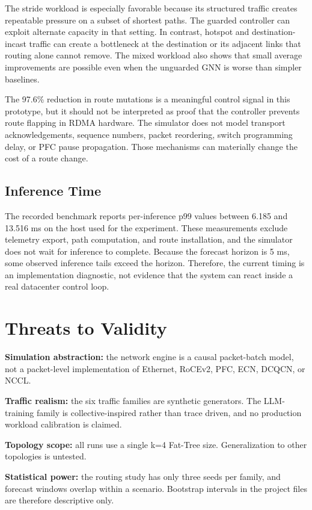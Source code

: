 \documentclass[conference]{IEEEtran}
\begin{document}
The stride workload is especially favorable because its structured traffic creates repeatable pressure on a subset of shortest paths. The guarded controller can exploit alternate capacity in that setting. In contrast, hotspot and destination-incast traffic can create a bottleneck at the destination or its adjacent links that routing alone cannot remove. The mixed workload also shows that small average improvements are possible even when the unguarded GNN is worse than simpler baselines.

The 97.6\% reduction in route mutations is a meaningful control signal in this prototype, but it should not be interpreted as proof that the controller prevents route flapping in RDMA hardware. The simulator does not model transport acknowledgements, sequence numbers, packet reordering, switch programming delay, or PFC pause propagation. Those mechanisms can materially change the cost of a route change.

\subsection{Inference Time}
The recorded benchmark reports per-inference p99 values between 6.185 and 13.516 ms on the host used for the experiment. These measurements exclude telemetry export, path computation, and route installation, and the simulator does not wait for inference to complete. Because the forecast horizon is 5 ms, some observed inference tails exceed the horizon. Therefore, the current timing is an implementation diagnostic, not evidence that the system can react inside a real datacenter control loop.

\section{Threats to Validity}
\textbf{Simulation abstraction:} the network engine is a causal packet-batch model, not a packet-level implementation of Ethernet, RoCEv2, PFC, ECN, DCQCN, or NCCL.

\textbf{Traffic realism:} the six traffic families are synthetic generators. The LLM-training family is collective-inspired rather than trace driven, and no production workload calibration is claimed.

\textbf{Topology scope:} all runs use a single k=4 Fat-Tree size. Generalization to other topologies is untested.

\textbf{Statistical power:} the routing study has only three seeds per family, and forecast windows overlap within a scenario. Bootstrap intervals in the project files are therefore descriptive only.
\end{document}
